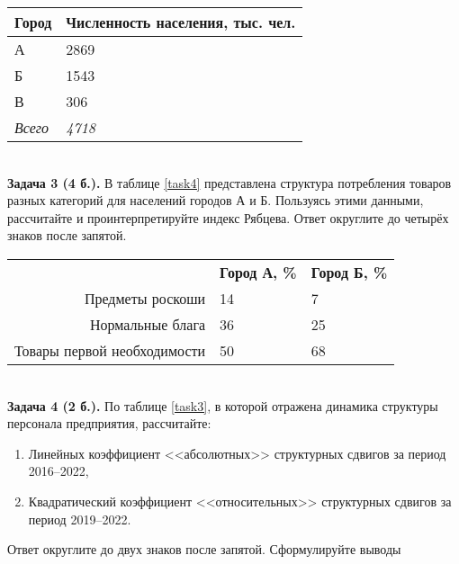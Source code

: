 \documentclass{article}
\begin{document}
\begin{minipage}{\textwidth}
\centering
\begin{tabularx}{0.4\textwidth}{YY}
\toprule
\textbf{Город} & \textbf{Численность населения, тыс. чел.} \\
\midrule
А & 2869 \\

Б & 1543 \\

В & 306 \\
\addlinespace
\textit{Всего} & \textit{4718} \\
\bottomrule
\end{tabularx}
\label{task8}
\end{minipage} \\[35pt]

\textbf{Задача 3 (4 б.).} В таблице \ref{task4} представлена структура потребления товаров разных категорий для населений городов А и Б. Пользуясь этими данными, рассчитайте и проинтерпретируйте индекс Рябцева. Ответ округлите до четырёх знаков после запятой.\\

\begin{minipage}{\textwidth}
\centering
\begin{tabularx}{0.7\textwidth}{rYY}
\toprule
 & \textbf{Город А, \%} & \textbf{Город Б, \%} \\
\cmidrule(lr){2-2}\cmidrule(lr){3-3}
Предметы роскоши & 14 & 7 \\

Нормальные блага & 36 & 25 \\

Товары первой необходимости & 50 & 68 \\
\bottomrule
\end{tabularx}
\label{task4}
\end{minipage} \\[35pt]

\textbf{Задача 4 (2 б.).} По таблице \ref{task3}, в которой отражена динамика структуры персонала предприятия, рассчитайте:
\begin{enumerate}[leftmargin=40pt]
\item Линейных коэффициент <<абсолютных>> структурных сдвигов за период 2016--2022,
\item Квадратический коэффициент <<относительных>> структурных сдвигов за период 2019--2022.\medskip
\end{enumerate}

Ответ округлите до двух знаков после запятой. Сформулируйте выводы\\
\end{document}
